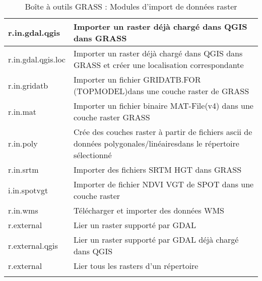 \begin{center}
{\begin{longtable}{|p{2.5cm}|p{11.5cm}|}
  \hline r.in.gdal.qgis & Importer un raster déjà chargé dans QGIS dans GRASS \\
  \hline r.in.gdal.qgis.loc & Importer un raster déjà chargé dans QGIS dans GRASS et créer une localisation correspondante \\
  \hline r.in.gridatb & Importer un fichier GRIDATB.FOR (TOPMODEL)dans une couche raster de GRASS\\
  \hline r.in.mat  & Importer un fichier binaire MAT-File(v4) dans une couche raster GRASS \\
  \hline r.in.poly  & Crée des couches raster à partir de fichiers ascii de données polygonales/linéairesdans le répertoire sélectionné \\
  \hline r.in.srtm  & Importer des fichiers SRTM HGT dans GRASS \\
  \hline i.in.spotvgt & Importer de fichier NDVI VGT de SPOT dans une couche raster \\
  \hline r.in.wms & Télécharger et importer des données WMS \\  
  \hline r.external & Lier un raster supporté par GDAL\\  
  \hline r.external.qgis & Lier un raster supporté par GDAL déjà chargé dans QGIS \\  
  \hline r.external & Lier tous les rasters d'un répertoire \\  
  \hline
\caption{Boîte à outils GRASS : Modules d'import de données raster}
\end{longtable}}
\end{center} 

